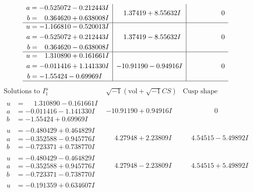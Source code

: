 \documentclass[1p]{elsarticle_modified}
\theoremstyle{definition}
\newcommand{\I}{\sqrt{-1}}
\begin{document}
$$\begin{array}{c|c|c}
\begin{aligned}
a &= -0.525072 - 0.212443 I \\
b &= \phantom{-}0.364620 + 0.638008 I\end{aligned}
 & \phantom{-}1.37419 + 8.55632 I & \phantom{-0.000000 } 0 \\ \hline\begin{aligned}
u &= -1.166810 - 0.520013 I \\
a &= -0.525072 + 0.212443 I \\
b &= \phantom{-}0.364620 - 0.638008 I\end{aligned}
 & \phantom{-}1.37419 - 8.55632 I & \phantom{-0.000000 } 0 \\ \hline\begin{aligned}
u &= \phantom{-}1.310890 + 0.161661 I \\
a &= -0.011416 + 1.141330 I \\
b &= -1.55424 - 0.69969 I\end{aligned}
 & -10.91190 - 0.94916 I & \phantom{-0.000000 } 0\\
 \hline 
 \end{array}$$\newpage$$\begin{array}{c|c|c}  
\text{Solutions to }I^u_{1}& \I (\text{vol} + \sqrt{-1}CS) & \text{Cusp shape}\\
 \hline 
\begin{aligned}
u &= \phantom{-}1.310890 - 0.161661 I \\
a &= -0.011416 - 1.141330 I \\
b &= -1.55424 + 0.69969 I\end{aligned}
 & -10.91190 + 0.94916 I & \phantom{-0.000000 } 0 \\ \hline\begin{aligned}
u &= -0.480429 + 0.464829 I \\
a &= -0.352588 - 0.945776 I \\
b &= -0.723371 + 0.738770 I\end{aligned}
 & \phantom{-}4.27948 + 2.23809 I & \phantom{-}4.54515 - 5.49892 I \\ \hline\begin{aligned}
u &= -0.480429 - 0.464829 I \\
a &= -0.352588 + 0.945776 I \\
b &= -0.723371 - 0.738770 I\end{aligned}
 & \phantom{-}4.27948 - 2.23809 I & \phantom{-}4.54515 + 5.49892 I \\ \hline\begin{aligned}
u &= -0.191359 + 0.634607 I \\

\end{aligned}
\end{array}$$
\end{document}
